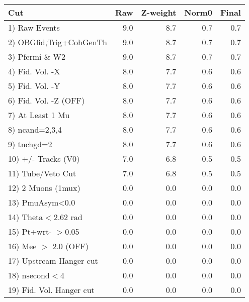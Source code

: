  \begin{table}[h!]\centering
 \begin{tabular}{||l||r|r|r|r||}
 \hline
 \hline
 Cut & Raw & Z-weight & Norm0 & Final \\
 \hline
  1) Raw Events           &         9.0 &         8.7 &         0.7 &         0.7 \\
  2) OBGfid,Trig+CohGenTh &         9.0 &         8.7 &         0.7 &         0.7 \\
  3) Pfermi \& W2         &         9.0 &         8.7 &         0.7 &         0.7 \\
  4) Fid. Vol. -X         &         8.0 &         7.7 &         0.6 &         0.6 \\
  5) Fid. Vol. -Y         &         8.0 &         7.7 &         0.6 &         0.6 \\
  6) Fid. Vol. -Z (OFF)   &         8.0 &         7.7 &         0.6 &         0.6 \\
  7) At Least 1 Mu        &         8.0 &         7.7 &         0.6 &         0.6 \\
  8) ncand=2,3,4          &         8.0 &         7.7 &         0.6 &         0.6 \\
  9) tnchgd=2             &         8.0 &         7.7 &         0.6 &         0.6 \\
 10) +/- Tracks (V0)      &         7.0 &         6.8 &         0.5 &         0.5 \\
 11) Tube/Veto Cut        &         7.0 &         6.8 &         0.5 &         0.5 \\
 12) 2 Muons (1mux)       &         0.0 &         0.0 &         0.0 &         0.0 \\
 13) PmuAsym<0.0          &         0.0 &         0.0 &         0.0 &         0.0 \\
 14) Theta$<$2.62 rad     &         0.0 &         0.0 &         0.0 &         0.0 \\
 15) Pt+wrt- $>$0.05      &         0.0 &         0.0 &         0.0 &         0.0 \\
 16) Mee $>$ 2.0  (OFF)   &         0.0 &         0.0 &         0.0 &         0.0 \\
 17) Upstream Hanger cut  &         0.0 &         0.0 &         0.0 &         0.0 \\
 18) nsecond$<$4          &         0.0 &         0.0 &         0.0 &         0.0 \\
 19) Fid. Vol. Hanger cut &         0.0 &         0.0 &         0.0 &         0.0 \\

\end{tabular}
\end{table}
